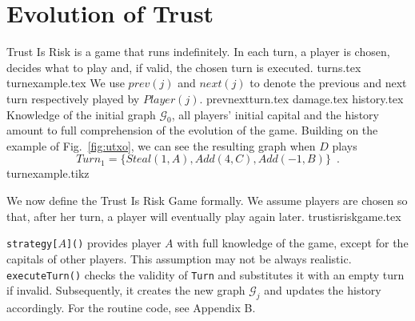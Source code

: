 \section{Evolution of Trust}
  Trust Is Risk is a game that runs indefinitely. In each turn, a player is chosen, decides what to play and, if valid, the
  chosen turn is executed.
  {turns.tex}
  \ifdefined\proceedings
  \else
    {turnexample.tex}
    We use $prev\left(j\right)$ and $next\left(j\right)$ to denote the previous and next turn respectively played by
    $Player(j)$.
  \fi
  {prevnextturn.tex}
  {damage.tex}
  {history.tex}
  \noindent Knowledge of the initial graph $\mathcal{G}_0$, all players' initial capital and the history amount to full
  comprehension of the evolution of the game. Building on the example of Fig.~\ref{fig:utxo}, we can see the resulting graph
  when $D$ plays
  \begin{equation}
  \label{turnexample}
     Turn_1 = \{Steal\left(1, A\right), Add\left(4, C\right), Add\left(-1, B\right)\} \enspace.
  \end{equation}
  {turnexample.tikz}

  \noindent We now define the Trust Is Risk Game formally. We assume players are chosen so that, after her turn, a player will
  eventually play again later.
  {trustisriskgame.tex}

  \noindent \texttt{strategy[}$A$\texttt{]()} provides player $A$ with full knowledge of the game, except for the capitals of
  other players. This assumption may not be always realistic. \texttt{executeTurn()} checks the validity of \texttt{Turn} and
  substitutes it with an empty turn if invalid. Subsequently, it creates the new graph $\mathcal{G}_j$ and updates the
  history accordingly. \ifdefined\proceedings\else For the routine code, see Appendix B.\fi
